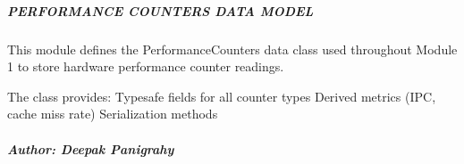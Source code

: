 \documentclass[letterpaper,10pt,english]{sphinxmanual}
\begin{document}
\subparagraph{PERFORMANCE COUNTERS DATA MODEL}
\label{\detokenize{core.models.performance_counters:performance-counters-data-model}}
\sphinxAtStartPar
This module defines the PerformanceCounters data class used throughout Module 1
to store hardware performance counter readings.

\sphinxAtStartPar
The class provides:
\sphinxhyphen{} Type\sphinxhyphen{}safe fields for all counter types
\sphinxhyphen{} Derived metrics (IPC, cache miss rate)
\sphinxhyphen{} Serialization methods


\subparagraph{Author: Deepak Panigrahy}
\label{\detokenize{core.models.performance_counters:author-deepak-panigrahy}}
\end{document}
